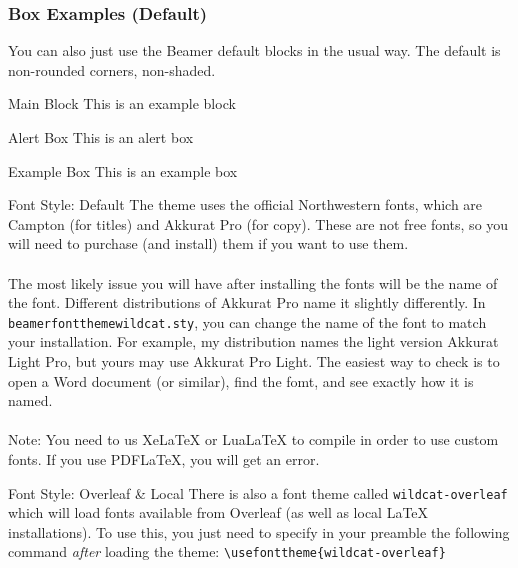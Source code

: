 \documentclass[aspectratio=1610]{beamer}
\begin{document}
\begin{frame}
    \frametitle{Box Examples (Default)}
    You can also just use the Beamer default blocks in the usual way. The default is non-rounded corners, non-shaded.
    \begin{block}{Main Block}
    This is an example block
    \end{block}
    \begin{alertblock}{Alert Box}
    This is an alert box
    \end{alertblock}
    \begin{exampleblock}{Example Box}
        This is an example box
    \end{exampleblock}
    \end{frame}

\begin{frame}{Font Style: Default}
    The theme uses the official Northwestern fonts, which are Campton (for titles) and Akkurat Pro (for copy). These are not free fonts, so you will need to purchase (and install) them if you want to use them.
    \\ ~ \\
    The most likely issue you will have after installing  the fonts will be the name of the font. Different distributions of Akkurat Pro name it slightly differently. In \texttt{beamerfontthemewildcat.sty}, you can change the name of the font to match your installation. For example, my distribution names the light version Akkurat Light Pro, but yours may use Akkurat Pro Light. The easiest way to check is to open a Word document (or similar), find the fomt, and see exactly how it is named.
    \\ ~ \\
    Note: You need to us XeLaTeX or LuaLaTeX to compile in order to use custom fonts. If you use PDFLaTeX, you will get an error.
\end{frame}

\begin{frame}{Font Style: Overleaf \& Local}
    There is also a font theme called \texttt{wildcat-overleaf} which will load fonts available from Overleaf (as well as local \LaTeX ~ installations). To use this, you just need to specify in your preamble the following command \textit{after} loading the theme: 
    \texttt{\textbackslash usefonttheme\{wildcat-overleaf\}}
\end{frame}
\end{document}
